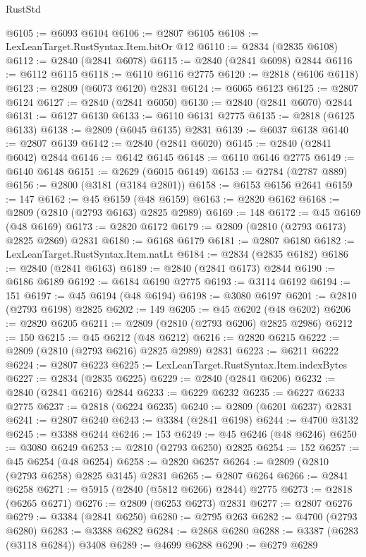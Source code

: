 \begin{lexlean}{RustStd}
\begin{coremodule}
{\begin{coremodule}
{{{{{{{{{{{{{{{{{{{{{{{{{{{{{{{{{@6105 := @6093 @6104
@6106 := @2807 @6105
@6108 := LexLeanTarget.RustSyntax.Item.bitOr @12
@6110 := @2834 (@2835 @6108)
@6112 := @2840 (@2841 @6078)
@6115 := @2840 (@2841 @6098) @2844
@6116 := @6112 @6115
@6118 := @6110 @6116 @2775
@6120 := @2818 (@6106 @6118)
@6123 := @2809 (@6073 @6120) @2831
@6124 := @6065 @6123
@6125 := @2807 @6124
@6127 := @2840 (@2841 @6050)
@6130 := @2840 (@2841 @6070) @2844
@6131 := @6127 @6130
@6133 := @6110 @6131 @2775
@6135 := @2818 (@6125 @6133)
@6138 := @2809 (@6045 @6135) @2831
@6139 := @6037 @6138
@6140 := @2807 @6139
@6142 := @2840 (@2841 @6020)
@6145 := @2840 (@2841 @6042) @2844
@6146 := @6142 @6145
@6148 := @6110 @6146 @2775
@6149 := @6140 @6148
@6151 := @2629 (@6015 @6149)
@6153 := @2784 (@2787 @889)
@6156 := @2800 (@3181 (@3184 @2801))
@6158 := @6153 @6156 @2641
@6159 := 147
@6162 := @45 @6159 (@48 @6159)
@6163 := @2820 @6162
@6168 := @2809 (@2810 (@2793 @6163) @2825 @2989)
@6169 := 148
@6172 := @45 @6169 (@48 @6169)
@6173 := @2820 @6172
@6179 := @2809 (@2810 (@2793 @6173) @2825 @2869) @2831
@6180 := @6168 @6179
@6181 := @2807 @6180
@6182 := LexLeanTarget.RustSyntax.Item.natLt
@6184 := @2834 (@2835 @6182)
@6186 := @2840 (@2841 @6163)
@6189 := @2840 (@2841 @6173) @2844
@6190 := @6186 @6189
@6192 := @6184 @6190 @2775
@6193 := @3114 @6192
@6194 := 151
@6197 := @45 @6194 (@48 @6194)
@6198 := @3080 @6197
@6201 := @2810 (@2793 @6198) @2825
@6202 := 149
@6205 := @45 @6202 (@48 @6202)
@6206 := @2820 @6205
@6211 := @2809 (@2810 (@2793 @6206) @2825 @2986)
@6212 := 150
@6215 := @45 @6212 (@48 @6212)
@6216 := @2820 @6215
@6222 := @2809 (@2810 (@2793 @6216) @2825 @2989) @2831
@6223 := @6211 @6222
@6224 := @2807 @6223
@6225 := LexLeanTarget.RustSyntax.Item.indexBytes
@6227 := @2834 (@2835 @6225)
@6229 := @2840 (@2841 @6206)
@6232 := @2840 (@2841 @6216) @2844
@6233 := @6229 @6232
@6235 := @6227 @6233 @2775
@6237 := @2818 (@6224 @6235)
@6240 := @2809 (@6201 @6237) @2831
@6241 := @2807 @6240
@6243 := @3384 (@2841 @6198)
@6244 := @4700 @3132
@6245 := @3388 @6244
@6246 := 153
@6249 := @45 @6246 (@48 @6246)
@6250 := @3080 @6249
@6253 := @2810 (@2793 @6250) @2825
@6254 := 152
@6257 := @45 @6254 (@48 @6254)
@6258 := @2820 @6257
@6264 := @2809 (@2810 (@2793 @6258) @2825 @3145) @2831
@6265 := @2807 @6264
@6266 := @2841 @6258
@6271 := @5915 (@2840 (@5812 @6266) @2844) @2775
@6273 := @2818 (@6265 @6271)
@6276 := @2809 (@6253 @6273) @2831
@6277 := @2807 @6276
@6279 := @3384 (@2841 @6250)
@6280 := @2795 @263
@6282 := @4700 (@2793 @6280)
@6283 := @3388 @6282
@6284 := @2868 @6280
@6288 := @3387 (@6283 (@3118 @6284)) @3408
@6289 := @4699 @6288
@6290 := @6279 @6289
}}}}}}}}}}}}}}}}}}}}}}}}}}}}}}}}}
\end{coremodule}}
\end{coremodule}
\end{lexlean}
